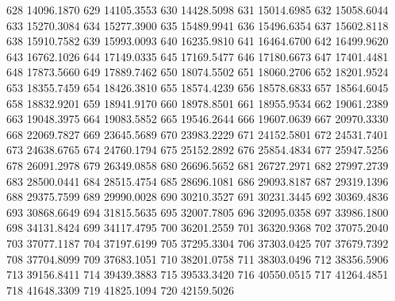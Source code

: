 628 14096.1870
629 14105.3553
630 14428.5098
631 15014.6985
632 15058.6044
633 15270.3084
634 15277.3900
635 15489.9941
636 15496.6354
637 15602.8118
638 15910.7582
639 15993.0093
640 16235.9810
641 16464.6700
642 16499.9620
643 16762.1026
644 17149.0335
645 17169.5477
646 17180.6673
647 17401.4481
648 17873.5660
649 17889.7462
650 18074.5502
651 18060.2706
652 18201.9524
653 18355.7459
654 18426.3810
655 18574.4239
656 18578.6833
657 18564.6045
658 18832.9201
659 18941.9170
660 18978.8501
661 18955.9534
662 19061.2389
663 19048.3975
664 19083.5852
665 19546.2644
666 19607.0639
667 20970.3330
668 22069.7827
669 23645.5689
670 23983.2229
671 24152.5801
672 24531.7401
673 24638.6765
674 24760.1794
675 25152.2892
676 25854.4834
677 25947.5256
678 26091.2978
679 26349.0858
680 26696.5652
681 26727.2971
682 27997.2739
683 28500.0441
684 28515.4754
685 28696.1081
686 29093.8187
687 29319.1396
688 29375.7599
689 29990.0028
690 30210.3527
691 30231.3445
692 30369.4836
693 30868.6649
694 31815.5635
695 32007.7805
696 32095.0358
697 33986.1800
698 34131.8424
699 34117.4795
700 36201.2559
701 36320.9368
702 37075.2040
703 37077.1187
704 37197.6199
705 37295.3304
706 37303.0425
707 37679.7392
708 37704.8099
709 37683.1051
710 38201.0758
711 38303.0496
712 38356.5906
713 39156.8411
714 39439.3883
715 39533.3420
716 40550.0515
717 41264.4851
718 41648.3309
719 41825.1094
720 42159.5026
